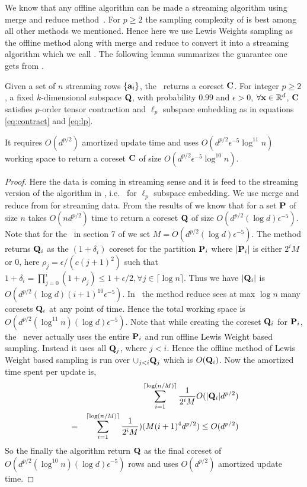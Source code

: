 We know that any offline algorithm can be made a streaming algorithm using merge and reduce method~\cite{har2004coresets}. For $p \geq 2$ the sampling complexity of \cite{cohen2015p} is best among all other methods we mentioned. Hence here we use Lewis Weights sampling \cite{cohen2015p} as the offline method along with merge and reduce to convert it into a streaming algorithm which we call \mrlw. The following lemma summarizes the guarantee one gets from \mrlw.
% 
\begin{lemma}\label{lemma:Stream-MR}
 Given a set of $n$ streaming rows $\{\mathbf{a}_{i}\}$, the \mrlw~returns a coreset $\mathbf{C}$. For integer $p \geq 2$, a fixed $k$-dimensional subspace $\mathbf{Q}$, with probability $0.99$ and $\epsilon > 0$, $\forall \mathbf{x}\in \mathbb{R}^{d}$, $\mathbf{C}$ satisfies $p$-order tensor contraction and $\ell_{p}$ subspace embedding as in equations \eqref{eq:contract} and \eqref{eq:lp}.

 It requires $O(d^{p/2})$ amortized update time and uses $O(d^{p/2}\epsilon^{-5}\log^{11} n)$ working space to return a coreset $\mathbf{C}$ of size $O(d^{p/2}\epsilon^{-5}\log^{10} n)$.
\end{lemma}
\begin{proof}\label{proof:Stream-MR}
 Here the data is coming in streaming sense and it is feed to the streaming version of the algorithm in \cite{cohen2015p}, i.e. \mrlw~for $\ell_{p}$ subspace embedding. We use merge and reduce from \cite{har2004coresets} for streaming data. From the results of \cite{cohen2015p} we know that for a set $\mathbf{P}$ of size $n$ takes $O(nd^{p/2})$ time to return a coreset $\mathbf{Q}$ of size $O(d^{p/2}(\log d)\epsilon^{-5})$. Note that for the \mrlw~in section 7 of \cite{har2004coresets} we set $M=O(d^{p/2}(\log d)\epsilon^{-5})$. The method returns $\mathbf{Q}_{i}$ as the $(1 + \delta_{i})$ coreset for the partition $\mathbf{P}_{i}$ where $|\mathbf{P}_{i}|$ is either $2^{i}M$ or $0$, here $\rho_{j} = \epsilon/(c(j+1)^{2})$ such that $1+\delta_{i} = \prod_{j=0}^{i} (1 + \rho_{j}) \leq 1 + \epsilon/2, \forall j \in \lceil \log n \rceil$. Thus we have $|\mathbf{Q}_{i}|$ is $O(d^{p/2}(\log d)(i+1)^{10}\epsilon^{-5})$. In \mrlw~the method reduce sees at max $\log n$ many coresets $\mathbf{Q}_{i}$ at any point of time. Hence the total working space is $O(d^{p/2}(\log^{11} n)(\log d)\epsilon^{-5})$. Note that while creating the coreset $\mathbf{Q}_{i}$ for $\mathbf{P}_{i}$, the \mrlw~never actually uses the entire $\mathbf{P}_{i}$ and run offline Lewis Weight based sampling. Instead it uses all $\mathbf{Q}_{j}$, where $j < i$. Hence the offline method of Lewis Weight based sampling is run over $\cup_{j < i} \mathbf{Q}_{j}$ which is $O(\mathbf{Q}_{i})$. Now the amortized time spent per update is,
 \begin{eqnarray*}
  && \sum_{i=1}^{\lceil \log (n/M) \rceil} \frac{1}{2^{i}M}O(|\mathbf{Q}_{i}|d^{p/2}) \\
  &=& \sum_{i=1}^{\lceil \log (n/M) \rceil} \frac{1}{2^{i}M})(M(i+1)^{4}d^{p/2}) \leq O(d^{p/2})
 \end{eqnarray*}
So the finally the algorithm return $\mathbf{Q}$ as the final coreset of $O(d^{p/2}(\log^{10} n)(\log d)\epsilon^{-5})$ rows and uses $O(d^{p/2})$ amortized update time.
\end{proof}
